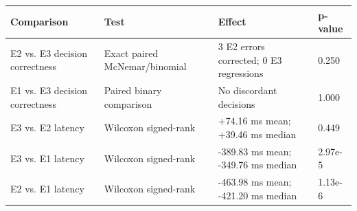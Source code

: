 \begin{tabular}{llll}
\toprule
Comparison & Test & Effect & p-value \\
\midrule
E2 vs. E3 decision correctness & Exact paired McNemar/binomial & 3 E2 errors corrected; 0 E3 regressions & 0.250 \\
E1 vs. E3 decision correctness & Paired binary comparison & No discordant decisions & 1.000 \\
E3 vs. E2 latency & Wilcoxon signed-rank & +74.16 ms mean; +39.46 ms median & 0.449 \\
E3 vs. E1 latency & Wilcoxon signed-rank & -389.83 ms mean; -349.76 ms median & 2.97e-5 \\
E2 vs. E1 latency & Wilcoxon signed-rank & -463.98 ms mean; -421.20 ms median & 1.13e-6 \\
\bottomrule
\end{tabular}
